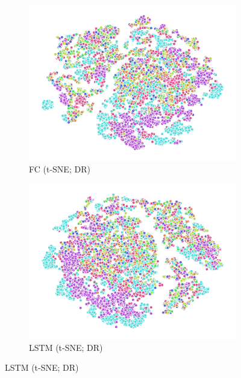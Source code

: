 \begin{figure}
\begin{subfigure}{0.22\textwidth}
    \includegraphics[width=\textwidth]{figures/chapter6/embeddings/jaco_DR_prop_fc1_tSNE.png}
    \caption{FC (t-SNE; DR)}
  \end{subfigure}
  \begin{subfigure}{0.22\textwidth}
    \includegraphics[width=\textwidth]{figures/chapter6/embeddings/jaco_DR_prop_h_tSNE.png}
    \caption{LSTM (t-SNE; DR)}
  \end{subfigure}


\end{figure}
